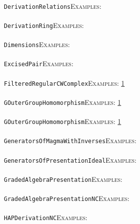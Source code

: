 \documentclass[a4paper,11pt]{report}
\begin{document}
{{ \\
 \texttt{DerivationRelations}{\nobreakspace}{\nobreakspace}{\nobreakspace}{\nobreakspace}\textsc{Examples:} \\
 \\
 \texttt{DerivationRing}{\nobreakspace}{\nobreakspace}{\nobreakspace}{\nobreakspace}\textsc{Examples:} \\
 \\
 \texttt{Dimensions}{\nobreakspace}{\nobreakspace}{\nobreakspace}{\nobreakspace}\textsc{Examples:} \\
 \\
 \texttt{ExcisedPair}{\nobreakspace}{\nobreakspace}{\nobreakspace}{\nobreakspace}\textsc{Examples:} \\
 \\
 \texttt{FilteredRegularCWComplex}{\nobreakspace}{\nobreakspace}{\nobreakspace}{\nobreakspace}\textsc{Examples:} \href{tutorial/chap4.html} {1}{\nobreakspace} \\
 \\
 \texttt{GOuterGroupHomomorphism}{\nobreakspace}{\nobreakspace}{\nobreakspace}{\nobreakspace}\textsc{Examples:} \href{../www/SideLinks/About/aboutCoefficientSequence.html} {1}{\nobreakspace} \\
 \\
 \texttt{GOuterGroupHomomorphism}{\nobreakspace}{\nobreakspace}{\nobreakspace}{\nobreakspace}\textsc{Examples:} \href{../www/SideLinks/About/aboutCoefficientSequence.html} {1}{\nobreakspace} \\
 \\
 \texttt{GeneratorsOfMagmaWithInverses}{\nobreakspace}{\nobreakspace}{\nobreakspace}{\nobreakspace}\textsc{Examples:} \\
 \\
 \texttt{GeneratorsOfPresentationIdeal}{\nobreakspace}{\nobreakspace}{\nobreakspace}{\nobreakspace}\textsc{Examples:} \\
 \\
 \texttt{GradedAlgebraPresentation}{\nobreakspace}{\nobreakspace}{\nobreakspace}{\nobreakspace}\textsc{Examples:} \\
 \\
 \texttt{GradedAlgebraPresentationNC}{\nobreakspace}{\nobreakspace}{\nobreakspace}{\nobreakspace}\textsc{Examples:} \\
 \\
 \texttt{HAPDerivationNC}{\nobreakspace}{\nobreakspace}{\nobreakspace}{\nobreakspace}\textsc{Examples:} \\
 \\
}}
\end{document}
